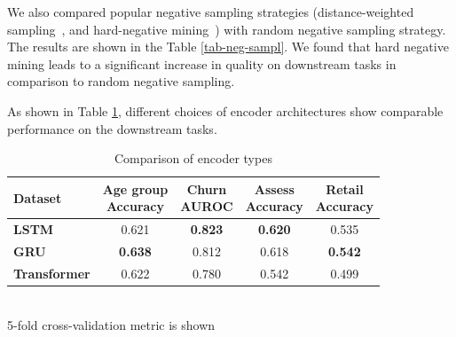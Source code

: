 \documentclass[sigconf, anonymous]{acmart}
\begin{document}
We also compared popular negative sampling strategies (distance-weighted sampling~\citep{Manmatha2017SamplingMI}, and hard-negative mining~\citep{Schroff2015FaceNetAU}) with random negative sampling strategy.
The results are shown in the Table \ref{tab-neg-sampl}.
We found that hard negative mining leads to a significant increase in quality on downstream tasks in comparison to random negative sampling.

As shown in Table \ref{tab-enc-type}, different choices of encoder architectures show comparable performance on the downstream tasks.

\begin{table}
\centering
\caption{Comparison of encoder types}
\begin{tabular}{lcccc}

\toprule
\textbf{Dataset} &
\makecell{\textbf{Age group} \\ \small{Accuracy}} &
\makecell{\textbf{Churn} \\ \small{AUROC}} &
\makecell{\textbf{Assess} \\ \small{Accuracy}} &
\makecell{\textbf{Retail} \\ \small{Accuracy}} \\
\midrule

\textbf{LSTM} & 0.621 & \textbf{0.823} & \textbf{0.620} & 0.535 \\
\textbf{GRU} & \textbf{0.638} & 0.812 & 0.618 & \textbf{0.542} \\
\textbf{Transformer} & 0.622 & 0.780 & 0.542 & 0.499 \\

\bottomrule
\end{tabular} \\
\small{5-fold cross-validation metric is shown}
\label{tab-enc-type}
\end{table}
\end{document}
